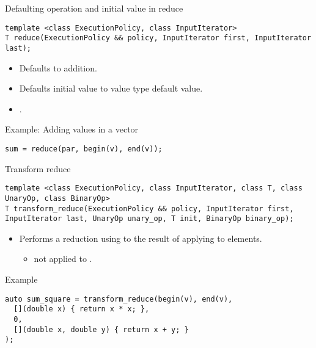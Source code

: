 \begin{frame}[t,fragile]{Defaulting operation and initial value in reduce}
\begin{lstlisting}[]
template <class ExecutionPolicy, class InputIterator>
T reduce(ExecutionPolicy && policy, InputIterator first, InputIterator last);
\end{lstlisting}
\begin{itemize}
  \item Defaults to addition.
  \item Defaults initial value to value type default value.
  \item {}.
\end{itemize}
\vfill
\begin{block}{Example: Adding values in a vector}
\begin{lstlisting}[]
sum = reduce(par, begin(v), end(v));
\end{lstlisting}
\end{block}
\end{frame}

\begin{frame}[t,fragile]{Transform reduce}
\begin{lstlisting}[]
template <class ExecutionPolicy, class InputIterator, class T, class UnaryOp, class BinaryOp>
T transform_reduce(ExecutionPolicy && policy, InputIterator first, InputIterator last, UnaryOp unary_op, T init, BinaryOp binary_op);
\end{lstlisting}
\begin{itemize}
  \item Performs a reduction using  
        to the result of applying  to elements.
    \begin{itemize}
      \item {} not applied to .
    \end{itemize}
\end{itemize}
\begin{block}{Example}
\begin{lstlisting}[basicstyle=\scriptsize]
auto sum_square = transform_reduce(begin(v), end(v), 
  [](double x) { return x * x; },
  0,
  [](double x, double y) { return x + y; }
);
\end{lstlisting}
\end{block}
\end{frame}

